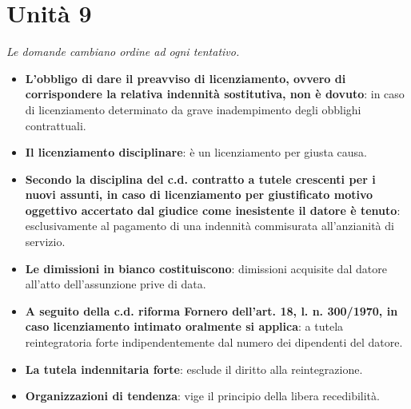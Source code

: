 \documentclass[12pt, a4paper]{report}
\begin{document}
\chapter{Unità 9}
    \textit{Le domande cambiano ordine ad ogni tentativo.}
    \begin{itemize}
        \item \textbf{L’obbligo di dare il preavviso di licenziamento, ovvero di corrispondere la relativa indennità sostitutiva, non è dovuto}: in caso di licenziamento determinato da grave inadempimento degli obblighi contrattuali.
        \item \textbf{Il licenziamento disciplinare}: è un licenziamento per giusta causa.
        \item \textbf{Secondo la disciplina del c.d. contratto a tutele crescenti per i nuovi assunti, in caso di licenziamento per giustificato motivo oggettivo accertato dal giudice come inesistente il datore è tenuto}: esclusivamente al pagamento di una indennità commisurata all’anzianità di servizio.
        \item \textbf{Le dimissioni in bianco costituiscono}: dimissioni acquisite dal datore all’atto dell’assunzione prive di data.
        \item \textbf{A seguito della c.d. riforma Fornero dell’art. 18, l. n. 300/1970, in caso licenziamento intimato oralmente si applica}: a tutela reintegratoria forte indipendentemente dal numero dei dipendenti del datore.
        \item \textbf{La tutela indennitaria forte}: esclude il diritto alla reintegrazione.
        \item \textbf{Organizzazioni di tendenza}: vige il principio della libera recedibilità.
    \end{itemize}
\end{document}

